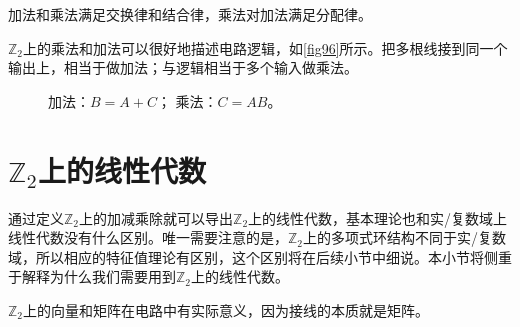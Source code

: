 加法和乘法满足交换律和结合律，乘法对加法满足分配律。

$\mathbb{Z}_2$上的乘法和加法可以很好地描述\termTR 电路逻辑，如\autoref{fig96}所示。把多根线接到同一个输出上，相当于做加法；与逻辑相当于多个输入做乘法。

\begin{figure}[!htp]
  \centering
  \caption{
    \protect{}加法：$B=A+C$；
    \protect{}乘法：$C=AB$。
  }\label{fig96}
\end{figure}

\section{\texorpdfstring{$\mathbb{Z}_2$}{Z\_2}上的线性代数}
通过定义$\mathbb{Z}_2$上的加减乘除就可以导出$\mathbb{Z}_2$上的线性代数，基本理论也和实/复数域上线性代数没有什么区别。唯一需要注意的是，$\mathbb{Z}_2$上的多项式环结构不同于实/复数域，所以相应的特征值理论有区别，这个区别将在后续小节中细说。本小节将侧重于解释为什么我们需要用到$\mathbb{Z}_2$上的线性代数。

$\mathbb{Z}_2$上的向量和矩阵在电路中有实际意义，因为接线的本质就是矩阵。

